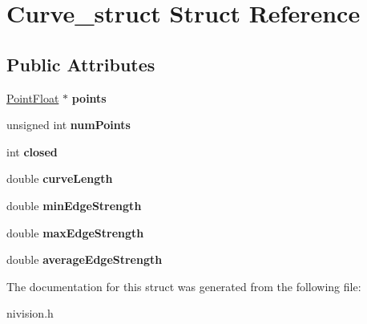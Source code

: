 \hypertarget{structCurve__struct}{\section{\-Curve\-\_\-struct \-Struct \-Reference}
\label{structCurve__struct}
}
\subsection*{\-Public \-Attributes}
\begin{DoxyCompactItemize}
\item 
\hypertarget{structCurve__struct_ac0f402ddc03efbaf4f6e047e634042d9}{\hyperlink{structPointFloat__struct}{\-Point\-Float} $\ast$ {\bfseries points}}\label{structCurve__struct_ac0f402ddc03efbaf4f6e047e634042d9}

\item 
\hypertarget{structCurve__struct_aef2c330735efa4968e30dc8184debf6c}{unsigned int {\bfseries num\-Points}}\label{structCurve__struct_aef2c330735efa4968e30dc8184debf6c}

\item 
\hypertarget{structCurve__struct_a5a18e1f239023408a4af591f25a4e60f}{int {\bfseries closed}}\label{structCurve__struct_a5a18e1f239023408a4af591f25a4e60f}

\item 
\hypertarget{structCurve__struct_af1922ae323af3192fafb8046323d8479}{double {\bfseries curve\-Length}}\label{structCurve__struct_af1922ae323af3192fafb8046323d8479}

\item 
\hypertarget{structCurve__struct_ad3ac85f4d7f2cdbf35a912800ba319ea}{double {\bfseries min\-Edge\-Strength}}\label{structCurve__struct_ad3ac85f4d7f2cdbf35a912800ba319ea}

\item 
\hypertarget{structCurve__struct_aaebad88fff0f6222dc5491415f872648}{double {\bfseries max\-Edge\-Strength}}\label{structCurve__struct_aaebad88fff0f6222dc5491415f872648}

\item 
\hypertarget{structCurve__struct_a19032aec878d31f443da03f682c3805f}{double {\bfseries average\-Edge\-Strength}}\label{structCurve__struct_a19032aec878d31f443da03f682c3805f}

\end{DoxyCompactItemize}


\-The documentation for this struct was generated from the following file\-:\begin{DoxyCompactItemize}
\item 
nivision.\-h\end{DoxyCompactItemize}
